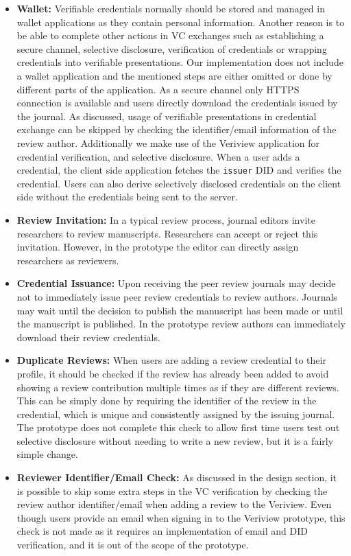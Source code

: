 \begin{itemize}
    \item \textbf{Wallet:} Verifiable credentials normally should be stored and managed in wallet applications as they contain personal information. Another reason is to be able to complete other actions in \acrshort{VC} exchanges such as establishing a secure channel, selective disclosure, verification of credentials or wrapping credentials into verifiable presentations. Our implementation does not include a wallet application and the mentioned steps are either omitted or done by different parts of the application. As a secure channel only \acrshort{HTTP}S connection is available and users directly download the credentials issued by the journal. As discussed, usage of verifiable presentations in credential exchange can be skipped by checking the identifier/email information of the review author. Additionally we make use of the Veriview application for credential verification, and selective disclosure. When a user adds a credential, the client side application fetches the \lstinline{issuer} \acrshort{DID} and verifies the credential. Users can also derive selectively disclosed credentials on the client side without the credentials being sent to the server. 
    
    \item \textbf{Review Invitation:} In a typical review process, journal editors invite researchers to review manuscripts. Researchers can accept or reject this invitation. However, in the prototype the editor can directly assign researchers as reviewers.
    
    \item \textbf{Credential Issuance:} Upon receiving the peer review journals may decide not to immediately issue peer review credentials to review authors. Journals may wait until the decision to publish the manuscript has been made or until the manuscript is published. In the prototype review authors can immediately download their review credentials.
    
    \item \textbf{Duplicate Reviews:} When users are adding a review credential to their profile, it should be checked if the review has already been added to avoid showing a review contribution multiple times as if they are different reviews. This can be simply done by requiring the identifier of the review in the credential, which is unique and consistently assigned by the issuing journal. The prototype does not complete this check to allow first time users test out selective disclosure without needing to write a new review, but it is a fairly simple change.
    
    \item \textbf{Reviewer Identifier/Email Check:} As discussed in the design section, it is possible to skip some extra steps in the \acrshort{VC} verification by checking the review author identifier/email when adding a review to the Veriview. Even though users provide an email when signing in to the Veriview prototype, this check is not made as it requires an implementation of email and \acrshort{DID} verification, and it is out of the scope of the prototype.
    
\end{itemize}
